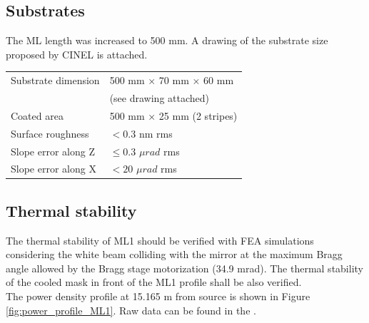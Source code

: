 \subsection{Substrates}
The ML length was increased to 500 mm. A drawing of the substrate size proposed by CINEL is attached.

\begin{center}
\begin{tabular}[bhp]{|p{} | p{}|}
\hline
Substrate dimension & 500 mm × 70 mm × 60 mm \\
 & (see drawing attached) \\
\hline
Coated area & 500 mm × 25 mm (2 stripes) \\
\hline
Surface roughness & $< 0.3$ nm rms \\
\hline
Slope error along Z & $\leq 0.3$ $\mu rad$ rms \\
\hline
Slope error along X & $< 20$ $\mu rad$ rms \\
\hline
\end{tabular}
\end{center}


% 

\clearpage
\subsection{Thermal stability}
The thermal stability of ML1 should be verified with FEA simulations considering the white beam colliding with the mirror at the maximum Bragg angle allowed by the Bragg stage motorization (34.9 mrad). The thermal stability of the cooled mask in front of the ML1 profile shall be also verified.\\

The power density profile at 15.165 m from source is shown in Figure \ref{fig:power_profile_ML1}. Raw data can be found in the \powerprofilesurl. \\

